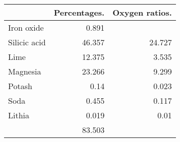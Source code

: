 \documentclass[a4paper, 12pt, oneside]{article}
\begin{document}
\begin{table}[H]
    \centering
    \footnotesize
    \begin{tabular}{l r r}
        ~ & Percentages. & Oxygen ratios. \\ \hline
        Iron oxide & 0.891 & ~ \\
        Silicic acid & 46.357 & 24.727 \\
        Lime & 12.375 & 3.535 \\
        Magnesia & 23.266 & 9.299 \\
        Potash & 0.14 & 0.023 \\
        Soda & 0.455 & 0.117 \\
        Lithia & 0.019 & 0.01 \\ \hline
        ~ & 83.503 & ~ \\
    \end{tabular}
\end{table}
\end{document}

